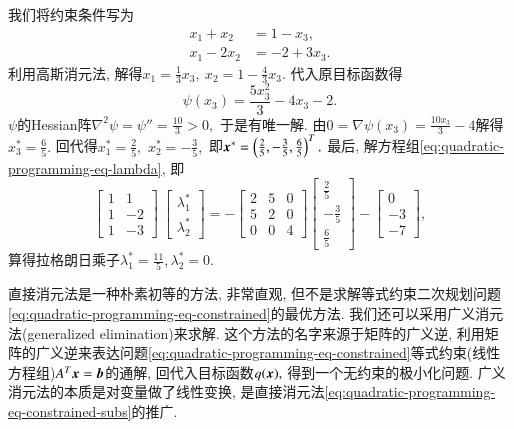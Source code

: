 \begin{eg}
我们将约束条件写为
\begin{equation*}
\begin{aligned}
x_1 + x_2 & = 1 - x_3, \\
x_1 - 2x_2 & = -2 + 3x_3.
\end{aligned}
\end{equation*}
利用高斯消元法, 解得$x_1 = \frac{1}{3} x_3, ~ x_2 = 1 - \frac{4}{3} x_3.$ 代入原目标函数得
\begin{equation*}
\psi(x_3) = \frac{5 x_{3}^{2}}{3} - 4 x_{3} - 2.
\end{equation*}
$\psi$的Hessian阵$\nabla^2 \psi = \psi'' = \frac{10}{3} > 0,$ 于是有唯一解. 由$0 = \nabla \psi (x_3) = \frac{10 x_{3}}{3} - 4$解得$x_3^* = \frac{6}{5}.$ 回代得$x_1^* = \frac{2}{5},$ $x_2^* = -\frac{3}{5},$ 即${\bm{x}}^* = \left( \frac{2}{5}, -\frac{3}{5}, \frac{6}{5} \right)^T.$ 最后, 解方程组\eqref{eq:quadratic-programming-eq-lambda}, 即
\begin{equation*}
\begin{bmatrix} 1 & 1 \\ 1 & -2 \\ 1 & -3 \end{bmatrix} ~ \begin{bmatrix} \lambda_1^* \\ \lambda_2^* \end{bmatrix} = - \begin{bmatrix} 2 & 5 & 0 \\ 5 & 2 & 0 \\ 0 & 0 & 4 \end{bmatrix} \begin{bmatrix} \frac{2}{5} \\ -\frac{3}{5} \\ \frac{6}{5} \end{bmatrix} - \begin{bmatrix} 0 \\ -3 \\ -7 \end{bmatrix},
\end{equation*}
算得拉格朗日乘子$\lambda_1^* = \frac{11}{5}, \lambda_2^* = 0.$
\end{eg}

直接消元法是一种朴素初等的方法, 非常直观, 但不是求解等式约束二次规划问题\eqref{eq:quadratic-programming-eq-constrained}的最优方法. 我们还可以采用广义消元法(generalized elimination)来求解. 这个方法的名字来源于矩阵的广义逆, 利用矩阵的广义逆来表达问题\eqref{eq:quadratic-programming-eq-constrained}等式约束(线性方程组)$A^T {\bm{x}} = {\bm{b}}$的通解, 回代入目标函数$q({\bm{x}}),$ 得到一个无约束的极小化问题. 广义消元法的本质是对变量做了线性变换, 是直接消元法\eqref{eq:quadratic-programming-eq-constrained-subs}的推广.

